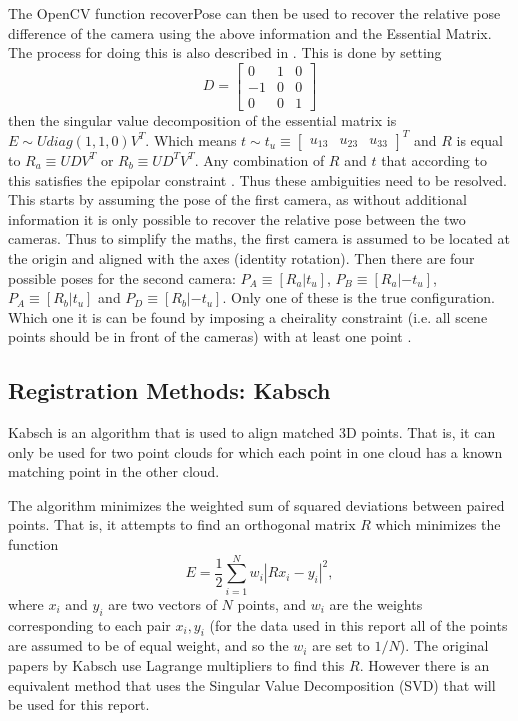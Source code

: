 \documentclass[12pt,a4paper]{article}
\begin{document}
    The OpenCV function recoverPose can then be used to recover the relative pose difference of the camera using the above information and the Essential Matrix. The process for doing this is also described in \cite{nister2003efficient}. This is done by setting 
    \[
    D = \begin{bmatrix}  0 & 1 & 0 \\-1 & 0 & 0 \\ 0 & 0 & 1 \end{bmatrix}
    \]
    then the singular value decomposition of the essential matrix is $E \sim U diag(1,1,0)V^T$. Which means $t \sim t_u \equiv \begin{bmatrix} u_{13} & u_{23} & u_{33} \end{bmatrix}^T$ and $R$ is equal to $R_a \equiv UDV^T$ or $R_b \equiv UD^TV^T$. Any combination of $R$ and $t$ that according to this satisfies the epipolar constraint \cite{nister2003efficient}. Thus these ambiguities need to be resolved. This starts by assuming the pose of the first camera, as without additional information it is only possible to recover the relative pose between the two cameras. Thus to simplify the maths, the first camera is assumed to be located at the origin and aligned with the axes (identity rotation). Then there are four possible poses for the second camera: $P_A \equiv [R_a | t_u]$, $P_B \equiv [R_a | -t_u]$, $P_A \equiv [R_b | t_u]$ and $P_D \equiv [R_b | -t_u]$. Only one of these is the true configuration. Which one it is can be found by imposing a cheirality constraint (i.e. all scene points should be in front of the cameras) with at least one point \cite{nister2003efficient}.

  \subsection{Registration Methods: Kabsch}
    \label{ssec: BI kabsch}
    Kabsch \cite{kabsch1976solution} is an algorithm that is used to align matched 3D points. That is, it can only be used for two point clouds for which each point in one cloud has a known matching point in the other cloud. 
     
    The algorithm minimizes the weighted sum of squared deviations between paired points. That is, it attempts to find an orthogonal matrix $R$ which minimizes the function
    \[
    E = \frac{1}{2} \sum^N_{i=1} w_i |Rx_i - y_i|^2,
    \]
    where $x_i$ and $y_i$ are two vectors of $N$ points, and $w_i$ are the weights corresponding to each pair $x_i,y_i$ (for the data used in this report all of the points are assumed to be of equal weight, and so the $w_i$ are set to $1/N$). The original papers by Kabsch \cite{kabsch1978discussion,kabsch1976solution} use Lagrange multipliers to find this $R$. However there is an equivalent method that uses the Singular Value Decomposition (SVD) \cite{kavraki2009geometric} that will be used for this report.
     
\end{document}

